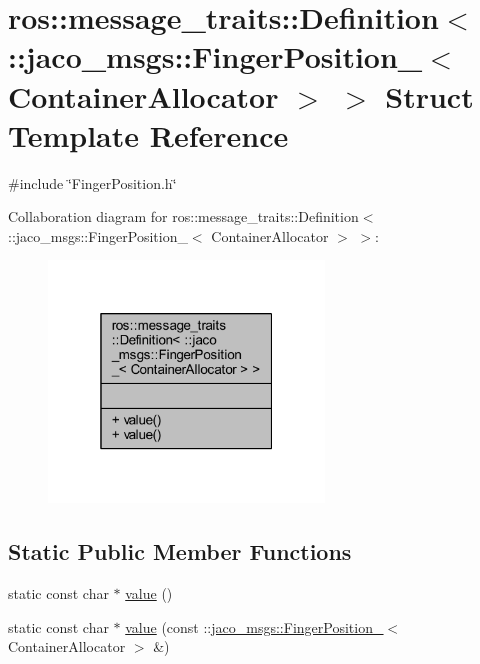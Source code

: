 \hypertarget{structros_1_1message__traits_1_1Definition_3_01_1_1jaco__msgs_1_1FingerPosition___3_01ContainerAllocator_01_4_01_4}{}\section{ros\+:\+:message\+\_\+traits\+:\+:Definition$<$ \+:\+:jaco\+\_\+msgs\+:\+:Finger\+Position\+\_\+$<$ Container\+Allocator $>$ $>$ Struct Template Reference}
\label{structros_1_1message__traits_1_1Definition_3_01_1_1jaco__msgs_1_1FingerPosition___3_01ContainerAllocator_01_4_01_4}


{\ttfamily \#include \char`\"{}Finger\+Position.\+h\char`\"{}}



Collaboration diagram for ros\+:\+:message\+\_\+traits\+:\+:Definition$<$ \+:\+:jaco\+\_\+msgs\+:\+:Finger\+Position\+\_\+$<$ Container\+Allocator $>$ $>$\+:
\nopagebreak
\begin{figure}[H]
\begin{center}
\leavevmode
\includegraphics[width=208pt]{db/d7b/structros_1_1message__traits_1_1Definition_3_01_1_1jaco__msgs_1_1FingerPosition___3_01ContainerAllocator_01_4_01_4__coll__graph}
\end{center}
\end{figure}
\subsection*{Static Public Member Functions}
\begin{DoxyCompactItemize}
\item 
static const char $\ast$ \hyperlink{structros_1_1message__traits_1_1Definition_3_01_1_1jaco__msgs_1_1FingerPosition___3_01ContainerAllocator_01_4_01_4_a9e85a9210f058b97897cf1bafa1302c4}{value} ()
\item 
static const char $\ast$ \hyperlink{structros_1_1message__traits_1_1Definition_3_01_1_1jaco__msgs_1_1FingerPosition___3_01ContainerAllocator_01_4_01_4_a7f54bb0cc3ac6faf5080b54329a068af}{value} (const \+::\hyperlink{structjaco__msgs_1_1FingerPosition__}{jaco\+\_\+msgs\+::\+Finger\+Position\+\_\+}$<$ Container\+Allocator $>$ \&)
\end{DoxyCompactItemize}


